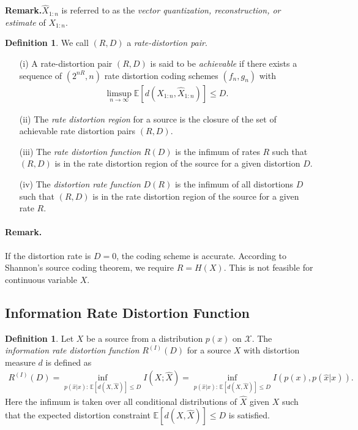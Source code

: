 \documentclass{article}
\numberwithin{equation}{section}
\newcommand{\E}{\mathbb{E}}
\renewcommand{\cal}{\mathcal}
\newcommand{\wh}{\widehat}
\theoremstyle{plain}
\theoremstyle{definition}
\newtheorem{definition}[theorem]{Definition}
\begin{document}
{\bf Remark.}\quad $\wh{X}_{1:n}$ is referred to as the \textit{vector quantization, reconstruction, or estimate} of $X_{1:n}$.
\begin{definition}
We call $(R,D)$ a \textit{rate-distortion pair}.
\begin{itemize}
\item[(i)] A rate-distortion pair $(R,D)$ is said to be \textit{achievable} if
there exists a sequence of $(2^{nR},n)$ rate distortion coding schemes $(f_n,g_n)$ with
\begin{align*}
	\limsup_{n\to\infty}\E\left[d(X_{1:n},\wh{X}_{1:n})\right]\leq D.
\end{align*}
\item[(ii)] The \textit{rate distortion region} for a source is the closure of the set of achievable rate distortion pairs $(R,D)$.
\item[(iii)] The \textit{rate distortion function} $R(D)$ is the infimum of rates $R$ such that $(R,D)$ is in the rate distortion region of the source for a given distortion $D$.
\item[(iv)]  The \textit{distortion rate function} $D(R)$ is the infimum of all distortions $D$ such that $(R,D)$ is in the rate distortion region of the source for a given rate $R$.
\end{itemize}
\end{definition}
\paragraph{Remark.} If the distortion rate is $D=0$, the coding scheme is accurate. According to Shannon's source coding theorem, we require $R=H(X)$. This is not feasible for continuous variable $X$.

\subsection{Information Rate Distortion Function}
\begin{definition}
Let $X$ be a source from a distribution $p(x)$ on $\cal{X}$. The \textit{information rate distortion function} $R^{(I)}(D)$ for a source
$X$ with distortion measure $d$ is defined as
\begin{align*}
	R^{(I)}(D)=\inf_{p(\wh{x}|x):\,\E[d(X,\wh{X})]\leq D} I(X;\wh{X})=\inf_{p(\wh{x}|x):\,\E[d(X,\wh{X})]\leq D} I(p(x),p(\wh{x}|x)).
\end{align*}
Here the infimum is taken over all conditional distributions of $\wh{X}$ given $X$ such that the expected distortion constraint $\E[d(X,\wh{X})]\leq D$ is satisfied.
\end{definition}
\end{document}
